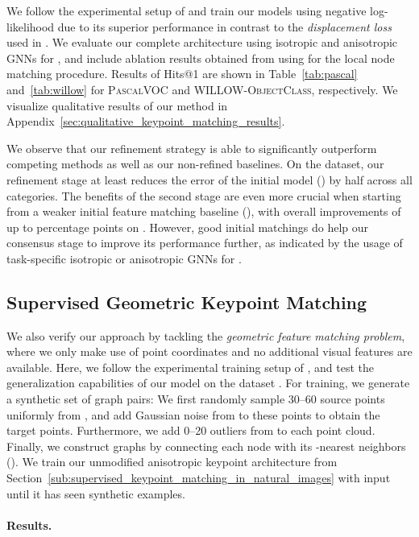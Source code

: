 \documentclass{article}
\begin{document}
We follow the experimental setup of \citet{Wang/etal/2019} and train our models using negative log-likelihood due to its superior performance in contrast to the \emph{displacement loss} used in \citet{Zanfir/Sminchisescu/2018}.
We evaluate our complete architecture using isotropic and anisotropic GNNs for , and include ablation results obtained from using  for the local node matching procedure.
Results of Hits@1 are shown in Table~\ref{tab:pascal} and~\ref{tab:willow} for \textsc{PascalVOC} and \textsc{WILLOW-ObjectClass}, respectively.
We visualize qualitative results of our method in Appendix~\ref{sec:qualitative_keypoint_matching_results}.

We observe that our refinement strategy is able to significantly outperform competing methods as well as our non-refined baselines.
On the  dataset, our refinement stage at least reduces the error of the initial model () by half across all categories.
The benefits of the second stage are even more crucial when starting from a weaker initial feature matching baseline (), with overall improvements of up to  percentage points on .
However, good initial matchings do help our consensus stage to improve its performance further, as indicated by the usage of task-specific isotropic or anisotropic GNNs for .

\subsection{Supervised Geometric Keypoint Matching}\label{sub:supervised_geometric_keypoint_matching}

We also verify our approach by tackling the \emph{geometric feature matching problem}, where we only make use of point coordinates and no additional visual features are available.
Here, we follow the experimental training setup of \citet{Zhang/Lee/2019}, and test the generalization capabilities of our model on the  dataset \citep{Ham/etal/2016}.
For training, we generate a synthetic set of graph pairs: We first randomly sample 30--60 source points uniformly from , and add Gaussian noise from  to these points to obtain the target points.
Furthermore, we add 0--20 outliers from  to each point cloud.
Finally, we construct graphs by connecting each node with its -nearest neighbors ().
We train our unmodified anisotropic keypoint architecture from Section~\ref{sub:supervised_keypoint_matching_in_natural_images} with input  until it has seen  synthetic examples.

\paragraph{Results.}
\end{document}
